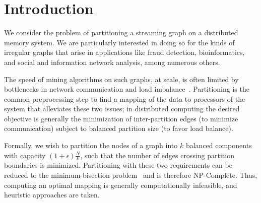 \section{Introduction}

We consider the problem of partitioning a streaming graph on a distributed memory system.
We are particularly interested in doing so for the kinds of irregular graphs that arise in applications like fraud detection, bioinformatics, and social and information network analysis, among numerous others.
%
%
The speed of mining algorithms on such graphs, at scale, is often limited by bottlenecks in network communication and load imbalance~\cite{challenglums}.
Partitioning is the common preprocessing step to find a mapping of the data to processors of the system that alleviates these two issues;
in distributed computing the desired objective is generally the minimization of inter-partition edges (to minimize communication) subject to balanced partition size (to favor load balance).

Formally, we wish to partition the nodes of a graph into $k$ balanced components with capacity $(1+\epsilon)\frac{N}{k}$, such that the number of edges crossing partition boundaries is minimized. Partitioning with these two requirements can be reduced to the minimum-bisection problem~\cite{Garey:1979:CIG:578533} and is therefore NP-Complete. 
Thus, computing an optimal mapping is generally computationally infeasible, and heuristic approaches are taken. 

